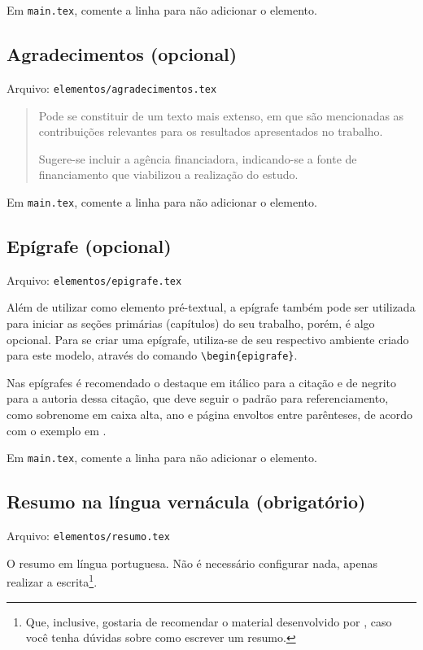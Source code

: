     Em \texttt{main.tex}, comente a linha \verb|| para não adicionar o elemento.

\subsection{Agradecimentos (opcional)}
    Arquivo: \texttt{elementos/agradecimentos.tex}

    \blockcquote[p.32]{livro:iffar-guia-normalizacao-2022}{Pode se constituir de um texto mais extenso, em que são mencionadas as contribuições relevantes para os resultados apresentados no trabalho.

    Sugere-se incluir a agência financiadora, indicando-se a fonte de
    financiamento que viabilizou a realização do estudo.}

    Em \texttt{main.tex}, comente a linha \verb|| para não adicionar o elemento.

\subsection{Epígrafe (opcional)}
    Arquivo: \texttt{elementos/epigrafe.tex}

    Além de utilizar como elemento pré-textual, a epígrafe também pode ser utilizada para iniciar as seções primárias (capítulos) do seu trabalho, porém, é algo opcional. Para se criar uma epígrafe, utiliza-se de seu respectivo ambiente criado para este modelo, através do comando \verb|\begin{epigrafe}|.

    Nas epígrafes é recomendado o destaque em itálico para a citação e de negrito para a autoria dessa citação, que deve seguir o padrão para referenciamento, como sobrenome em caixa alta, ano e página envoltos entre parênteses, de acordo com o exemplo em \textcite[figura 14, p. 39]{livro:iffar-guia-normalizacao-2022}.

    Em \texttt{main.tex}, comente a linha \verb|| para não adicionar o elemento.

\subsection{Resumo na língua vernácula (obrigatório)}
    Arquivo: \texttt{elementos/resumo.tex}

    O resumo em língua portuguesa. Não é necessário configurar nada, apenas realizar a escrita\footnote{Que, inclusive, gostaria de recomendar o material desenvolvido por \textcite{pdf:resumo-aluisio}, caso você tenha dúvidas sobre como escrever um resumo.}.

